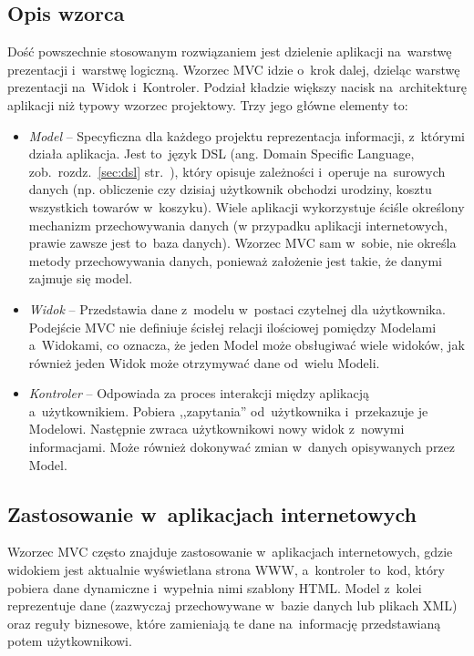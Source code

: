 \documentclass[a4paper,12pt,oneside]{report}
\begin{document}
\subsection{Opis wzorca}
\label{subsec:mvc-opis}
Dość powszechnie stosowanym rozwiązaniem jest dzielenie aplikacji na~warstwę prezentacji i~warstwę logiczną. Wzorzec MVC idzie o~krok dalej, dzieląc warstwę prezentacji na~Widok i~Kontroler. Podział kładzie większy nacisk na~architekturę aplikacji niż typowy wzorzec projektowy. Trzy jego główne elementy to:
\begin{itemize}
  \item \emph{Model} -- Specyficzna dla każdego projektu reprezentacja informacji, z~którymi działa aplikacja. Jest to~język DSL (ang. Domain Specific Language, zob.~rozdz.~\ref{sec:dsl} str.~\pageref{sec:dsl}), który opisuje zależności i~operuje na~surowych danych (np. obliczenie czy dzisiaj użytkownik obchodzi urodziny, kosztu wszystkich towarów w~koszyku). Wiele aplikacji wykorzystuje ściśle określony mechanizm przechowywania danych (w przypadku aplikacji internetowych, prawie zawsze jest to~baza danych). Wzorzec MVC sam w~sobie, nie określa metody przechowywania danych, ponieważ założenie jest takie, że danymi zajmuje się model.
  \item \emph{Widok} -- Przedstawia dane z~modelu w~postaci czytelnej dla użytkownika. Podejście MVC nie definiuje ścisłej relacji ilościowej pomiędzy Modelami a~Widokami, co oznacza, że jeden Model może obsługiwać wiele widoków, jak również jeden Widok może otrzymywać dane od~wielu Modeli.
  \item \emph{Kontroler} -- Odpowiada za proces interakcji między aplikacją a~użytkownikiem. Pobiera ,,zapytania'' od~użytkownika i~przekazuje je Modelowi. Następnie zwraca użytkownikowi nowy widok z~nowymi informacjami. Może również dokonywać zmian w~danych opisywanych przez Model.
\end{itemize}

\subsection{Zastosowanie w~aplikacjach internetowych}
\label{subsec:mvc-web}
Wzorzec MVC często znajduje zastosowanie w~aplikacjach internetowych, gdzie widokiem jest aktualnie wyświetlana strona WWW, a~kontroler to~kod, który pobiera dane dynamiczne i~wypełnia nimi szablony HTML. Model z~kolei reprezentuje dane (zazwyczaj przechowywane w~bazie danych lub plikach XML) oraz reguły biznesowe, które zamieniają te dane na~informację przedstawianą potem użytkownikowi.
\end{document}
